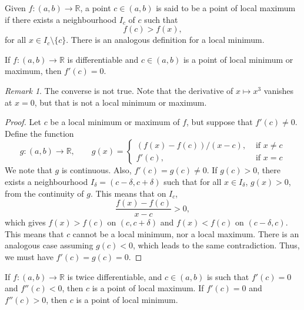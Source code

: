 \documentclass[11pt]{article}
\def\R{\mathbb{R}}
\theoremstyle{definition}
\theoremstyle{remark}
\newtheorem*{remark}{Remark}
\numberwithin{equation}{module}
\begin{document}
    \begin{definition}
        Given $f \colon (a, b) \to \R$, a point $c \in (a, b)$ is said to be a point
        of local maximum if there exists a neighbourhood $I_c$ of $c$ such that \[
            f(c) > f(x),
        \] for all $x \in I_c\setminus\{c\}$.
        There is an analogous definition for a local minimum.
    \end{definition}
    \begin{theorem}
        If $f\colon (a, b) \to \R$ is differentiable and $c \in (a, b)$ is a point
        of local minimum or maximum, then $f'(c) = 0$.
        \begin{remark}
            The converse is not true. Note that the derivative of $x \mapsto x^3$
            vanishes at $x = 0$, but that is not a local minimum or maximum.
        \end{remark}
    \end{theorem}
    \begin{proof}
        Let $c$ be a local minimum or maximum of $f$, but suppose that $f'(c) \neq 0$.
        Define the function \[
            g\colon (a, b) \to \R, \qquad g(x) = \begin{cases}
                (f(x) - f(c))/(x - c), &\text{ if } x \neq c \\                
                f'(c), &\text{ if } x = c
            \end{cases}
        \] We note that $g$ is continuous. Also, $f'(c) = g(c) \neq 0$.
        If $g(c) > 0$, there exists a neighbourhood $I_\delta = (c - \delta, c +
        \delta)$ such that for all $x \in I_\delta$, $g(x) > 0$, from the continuity
        of $g$. This means that on $I_c$, \[
            \frac{f(x) - f(c)}{x - c} > 0,
        \] which gives $f(x) > f(c)$ on $(c, c + \delta)$ and $f(x) < f(c)$ on $(c -
        \delta, c)$. This means that $c$ cannot be a local minimum, nor a local
        maximum. There is an analogous case assuming $g(c) < 0$, which leads to the
        same contradiction. Thus, we must have $f'(c) = g(c) = 0$.
    \end{proof}

    \begin{theorem}
        If $f\colon (a, b)\to \R$ is twice differentiable, and $c \in (a, b)$ is
        such that $f'(c) = 0$ and $f''(c) < 0$, then $c$ is a point of local
        maximum. If $f'(c) = 0$ and $f''(c) > 0$, then $c$ is a point of local
        minimum.
    \end{theorem}
\end{document}
